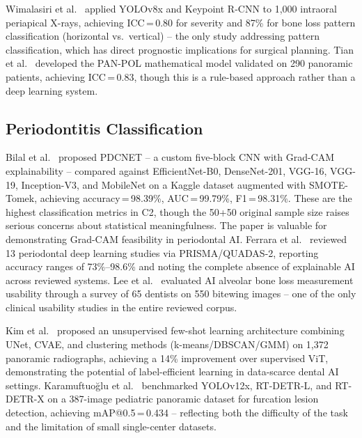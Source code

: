 \documentclass[conference]{IEEEtran}
\begin{document}
Wimalasiri et al.~\cite{wimalasiri2025ai} applied YOLOv8x and Keypoint
R-CNN to 1,000 intraoral periapical X-rays, achieving ICC\,=\,0.80 for
severity and 87\% for bone loss pattern classification (horizontal
vs.\ vertical) -- the only study addressing pattern classification,
which has direct prognostic implications for surgical planning. Tian et
al.~\cite{tian2025development} developed the PAN-POL mathematical model
validated on 290 panoramic patients, achieving ICC\,=\,0.83, though
this is a rule-based approach rather than a deep learning system.

\subsection{Periodontitis Classification}

Bilal et al.~\cite{bilal2024pdcnet} proposed PDCNET -- a custom
five-block CNN with Grad-CAM explainability -- compared against
EfficientNet-B0, DenseNet-201, VGG-16, VGG-19, Inception-V3, and
MobileNet on a Kaggle dataset augmented with SMOTE-Tomek, achieving
accuracy\,=\,98.39\%, AUC\,=\,99.79\%, F1\,=\,98.31\%. These are the
highest classification metrics in C2, though the 50+50 original sample
size raises serious concerns about statistical meaningfulness. The paper
is valuable for demonstrating Grad-CAM feasibility in periodontal AI.
Ferrara et al.~\cite{ferrara2025applications} reviewed 13 periodontal
deep learning studies via PRISMA/QUADAS-2, reporting accuracy ranges of
73\%--98.6\% and noting the complete absence of explainable AI across
reviewed systems. Lee et al.~\cite{lee2025evaluation} evaluated AI
alveolar bone loss measurement usability through a survey of 65 dentists
on 550 bitewing images -- one of the only clinical usability studies in
the entire reviewed corpus.

Kim et al.~\cite{kim2024unsupervised} proposed an unsupervised few-shot
learning architecture combining UNet, CVAE, and clustering methods
(k-means/DBSCAN/GMM) on 1,372 panoramic radiographs, achieving a 14\%
improvement over supervised ViT, demonstrating the potential of
label-efficient learning in data-scarce dental AI settings.
Karamuftuo\u{g}lu et al.~\cite{karamuftuo2025panoramic} benchmarked
YOLOv12x, RT-DETR-L, and RT-DETR-X on a 387-image pediatric panoramic
dataset for furcation lesion detection, achieving mAP@0.5\,=\,0.434 --
reflecting both the difficulty of the task and the limitation of small
single-center datasets.
\end{document}
